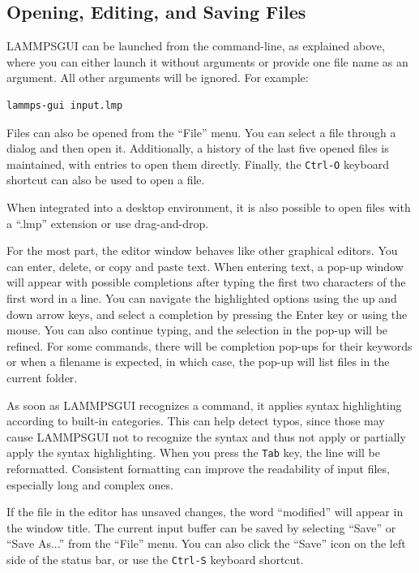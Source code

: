 \documentclass[9pt,tutorial]{livecoms}
\newcommand{\lammpsgui}{\textsf{LAMMPS\textendash GUI}}
\begin{document}
\begin{appendices}
\subsection{Opening, Editing, and Saving Files}

\lammpsgui{} can be launched from the command-line, as explained above, where you
can either launch it without arguments or provide one file name as an argument.  All
other arguments will be ignored.  For example:
\begin{lstlisting}[language=tcl]
lammps-gui input.lmp
\end{lstlisting}
Files can also be opened from the ``File'' menu.  You can select a
file through a dialog and then open it.  Additionally, a history of
the last five opened files is maintained, with entries to open them directly.
Finally, the \texttt{Ctrl-O} keyboard shortcut can also be used to open a file.

When integrated into a desktop environment, it is also possible to open
files with a ``.lmp'' extension or use drag-and-drop.

For the most part, the editor window behaves like other graphical
editors.  You can enter, delete, or copy and paste text.   When entering
text, a pop-up window will appear with possible completions after typing
the first two characters of the first word in a line.  You can
navigate the highlighted options using the up and down arrow keys, and select a
completion by pressing the Enter key or using the mouse.  You can also continue
typing, and the selection in the pop-up will be refined.  For some
commands, there will be completion pop-ups for their
keywords or when a filename is expected, in which case,
the pop-up will list files in the current folder.

As soon as \lammpsgui{} recognizes a command, it applies syntax
highlighting according to built-in categories.  This can help
detect typos, since those may cause \lammpsgui{} not to
recognize the syntax and thus not apply or partially apply
the syntax highlighting.  When you press the \texttt{Tab} key, the line will be
reformatted.  Consistent formatting can improve the readability of
input files, especially long and complex ones.

If the file in the editor has unsaved changes, the word
``\*modified\*'' will appear in the window title.  The current input
buffer can be saved by selecting ``Save'' or ``Save As...'' from the
``File'' menu.  You can also click the ``Save'' icon on the left side
of the status bar, or use the \texttt{Ctrl-S} keyboard shortcut.


\end{appendices}
\end{document}
